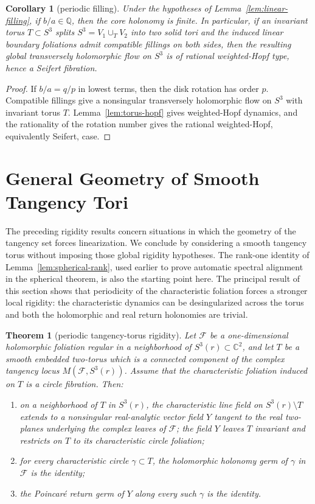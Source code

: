 \documentclass[11pt,reqno]{article}
\newtheorem{theorem}{Theorem}
\newtheorem{corollary}{Corollary}
\theoremstyle{remark}
\newcommand{\C}{\mathbb C}
\newcommand{\F}{\mathcal F}
\begin{document}
\begin{corollary}[periodic filling]\label{cor:periodic-filling}
Under the hypotheses of Lemma~\ref{lem:linear-filling}, if $b/a\in\mathbb Q$, then the core holonomy is finite. In particular, if an invariant torus $T\subset S^3$ splits $S^3=V_1\cup_TV_2$ into two solid tori and the induced linear boundary foliations admit compatible fillings on both sides, then the resulting global transversely holomorphic flow on $S^3$ is of rational weighted-Hopf type, hence a Seifert fibration.
\end{corollary}

\begin{proof}
If $b/a=q/p$ in lowest terms, then the disk rotation has order $p$. Compatible fillings give a nonsingular transversely holomorphic flow on $S^3$ with invariant torus $T$. Lemma~\ref{lem:torus-hopf} gives weighted-Hopf dynamics, and the rationality of the rotation number gives the rational weighted-Hopf, equivalently Seifert, case.
\end{proof}


\section{General Geometry of Smooth Tangency Tori}
The preceding rigidity results concern situations in which the geometry of the tangency set forces linearization. We conclude by considering a smooth tangency torus without imposing those global rigidity hypotheses. The rank-one identity of Lemma~\ref{lem:spherical-rank}, used earlier to prove automatic spectral alignment in the spherical theorem, is also the starting point here. The principal result of this section shows that periodicity of the characteristic foliation forces a stronger local rigidity: the characteristic dynamics can be desingularized across the torus and both the holomorphic and real return holonomies are trivial.

\begin{theorem}[periodic tangency-torus rigidity]\label{thm:periodic-torus-rigidity}
Let $\F$ be a one-dimensional holomorphic foliation regular in a neighborhood of $S^3(r)\subset\C^2$, and let $T$ be a smooth embedded two-torus which is a connected component of the complex tangency locus $M(\F,S^3(r))$. Assume that the characteristic foliation induced on $T$ is a circle fibration. Then:
\begin{enumerate}
\item on a neighborhood of $T$ in $S^3(r)$, the characteristic line field on $S^3(r)\setminus T$ extends to a nonsingular real-analytic vector field $Y$ tangent to the real two-planes underlying the complex leaves of $\F$; the field $Y$ leaves $T$ invariant and restricts on $T$ to its characteristic circle foliation;
\item for every characteristic circle $\gamma\subset T$, the holomorphic holonomy germ of $\gamma$ in $\F$ is the identity;
\item the Poincar\'e return germ of $Y$ along every such $\gamma$ is the identity.
\end{enumerate}
\end{theorem}
\end{document}
